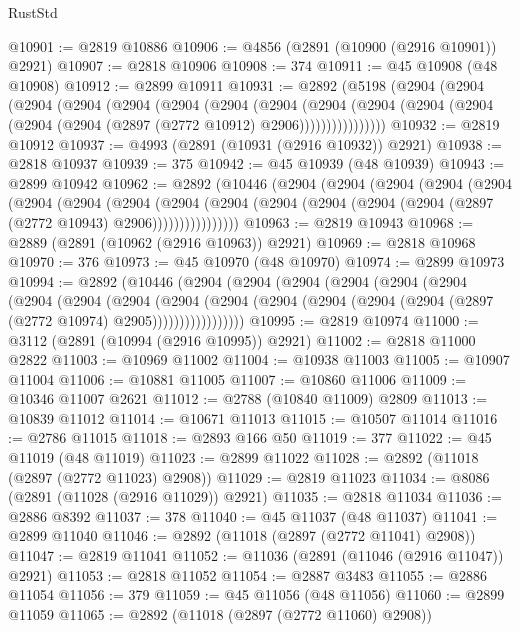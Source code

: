 \begin{lexlean}{RustStd}
\begin{coremodule}
@10901 := @2819 @10886
@10906 := @4856 (@2891 (@10900 (@2916 @10901)) @2921)
@10907 := @2818 @10906
@10908 := 374
@10911 := @45 @10908 (@48 @10908)
@10912 := @2899 @10911
@10931 := @2892
    (@5198
      (@2904
        (@2904
          (@2904
            (@2904
              (@2904
                (@2904
                  (@2904
                    (@2904
                      (@2904
                        (@2904
                          (@2904 (@2904 (@2904 (@2904 (@2897 (@2772 @10912) @2906))))))))))))))))
@10932 := @2819 @10912
@10937 := @4993 (@2891 (@10931 (@2916 @10932)) @2921)
@10938 := @2818 @10937
@10939 := 375
@10942 := @45 @10939 (@48 @10939)
@10943 := @2899 @10942
@10962 := @2892
    (@10446
      (@2904
        (@2904
          (@2904
            (@2904
              (@2904
                (@2904
                  (@2904
                    (@2904
                      (@2904
                        (@2904
                          (@2904 (@2904 (@2904 (@2904 (@2897 (@2772 @10943) @2906))))))))))))))))
@10963 := @2819 @10943
@10968 := @2889 (@2891 (@10962 (@2916 @10963)) @2921)
@10969 := @2818 @10968
@10970 := 376
@10973 := @45 @10970 (@48 @10970)
@10974 := @2899 @10973
@10994 := @2892
    (@10446
      (@2904
        (@2904
          (@2904
            (@2904
              (@2904
                (@2904
                  (@2904
                    (@2904
                      (@2904
                        (@2904
                          (@2904
                            (@2904 (@2904 (@2904 (@2904 (@2897 (@2772 @10974) @2905)))))))))))))))))
@10995 := @2819 @10974
@11000 := @3112 (@2891 (@10994 (@2916 @10995)) @2921)
@11002 := @2818 @11000 @2822
@11003 := @10969 @11002
@11004 := @10938 @11003
@11005 := @10907 @11004
@11006 := @10881 @11005
@11007 := @10860 @11006
@11009 := @10346 @11007 @2621
@11012 := @2788 (@10840 @11009) @2809
@11013 := @10839 @11012
@11014 := @10671 @11013
@11015 := @10507 @11014
@11016 := @2786 @11015
@11018 := @2893 @166 @50
@11019 := 377
@11022 := @45 @11019 (@48 @11019)
@11023 := @2899 @11022
@11028 := @2892 (@11018 (@2897 (@2772 @11023) @2908))
@11029 := @2819 @11023
@11034 := @8086 (@2891 (@11028 (@2916 @11029)) @2921)
@11035 := @2818 @11034
@11036 := @2886 @8392
@11037 := 378
@11040 := @45 @11037 (@48 @11037)
@11041 := @2899 @11040
@11046 := @2892 (@11018 (@2897 (@2772 @11041) @2908))
@11047 := @2819 @11041
@11052 := @11036 (@2891 (@11046 (@2916 @11047)) @2921)
@11053 := @2818 @11052
@11054 := @2887 @3483
@11055 := @2886 @11054
@11056 := 379
@11059 := @45 @11056 (@48 @11056)
@11060 := @2899 @11059
@11065 := @2892 (@11018 (@2897 (@2772 @11060) @2908))

\end{coremodule}
\end{lexlean}
